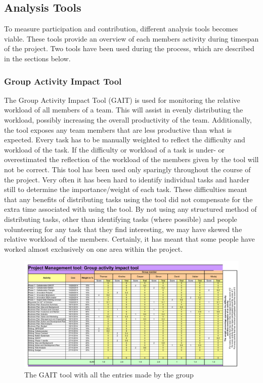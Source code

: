 \subsection{Analysis Tools}
To measure participation and contribution, different analysis tools becomes viable. These tools provide an overview of each members activity during timespan of the project. Two tools have been used during the process, which are described in the sections below.

\subsubsection{Group Activity Impact Tool}
 The Group Activity Impact Tool (GAIT) is used for monitoring the relative workload of all members of a team. This will assist in evenly distributing the workload, possibly increasing the overall productivity of the team. Additionally, the tool exposes any team members that are less productive than what is expected. Every task has to be manually weighted to reflect the difficulty and workload of the task. If the difficulty or workload of a task is under- or overestimated the reflection of the workload of the members given by the tool will not be correct.
This tool has been used only sparingly throughout the course of the project. Very often it has been hard to identify individual tasks and harder still to determine the importance/weight of each task. These difficulties meant that any benefits of distributing tasks using the tool did not compensate for the extra time associated with using the tool. 
 By not using any structured method of distributing tasks, other than identifying tasks (where possible) and people volunteering for any task that they find interesting, we may have skewed the relative workload of the members. Certainly, it has meant that some people have worked almost exclusively on one area within the project.
\begin{landscape}
	\begin{figure}[h!]
		\includegraphics[scale=1.25]{./graphics/GAIT}
		\caption{The GAIT tool with all the entries made by the group}
		\label{fig:GAIT}
	\end{figure}
\end{landscape}


